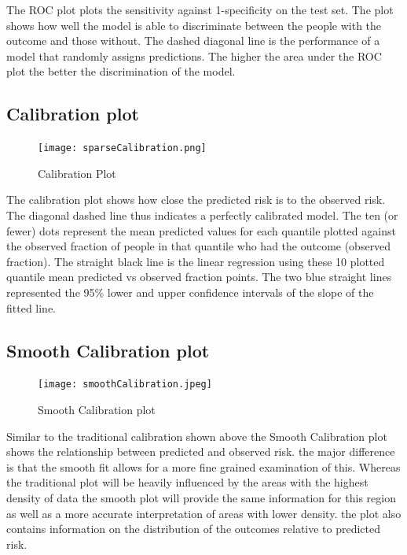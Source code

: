 \documentclass[]{article}
\begin{document}
The ROC plot plots the sensitivity against 1-specificity on the test
set. The plot shows how well the model is able to discriminate between
the people with the outcome and those without. The dashed diagonal line
is the performance of a model that randomly assigns predictions. The
higher the area under the ROC plot the better the discrimination of the
model.

\subsection{Calibration plot}\label{calibration-plot}

\begin{figure}
\centering
\texttt{[image: sparseCalibration.png]}
\caption{Calibration Plot}
\end{figure}

The calibration plot shows how close the predicted risk is to the
observed risk. The diagonal dashed line thus indicates a perfectly
calibrated model. The ten (or fewer) dots represent the mean predicted
values for each quantile plotted against the observed fraction of people
in that quantile who had the outcome (observed fraction). The straight
black line is the linear regression using these 10 plotted quantile mean
predicted vs observed fraction points. The two blue straight lines
represented the 95\% lower and upper confidence intervals of the slope
of the fitted line.

\subsection{Smooth Calibration plot}\label{smooth-calibration-plot}

\begin{figure}
\centering
\texttt{[image: smoothCalibration.jpeg]}
\caption{Smooth Calibration plot}
\end{figure}

Similar to the traditional calibration shown above the Smooth
Calibration plot shows the relationship between predicted and observed
risk. the major difference is that the smooth fit allows for a more fine
grained examination of this. Whereas the traditional plot will be
heavily influenced by the areas with the highest density of data the
smooth plot will provide the same information for this region as well as
a more accurate interpretation of areas with lower density. the plot
also contains information on the distribution of the outcomes relative
to predicted risk.
\end{document}
